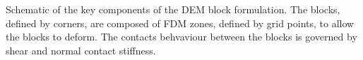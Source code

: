 \label{fig:DEM} Schematic of the key components of the DEM block formulation. The blocks, defined by corners, are composed of FDM zones, defined by grid points, to allow the blocks to deform. The contacts behvaviour between the blocks is governed by shear and normal contact stiffness. 